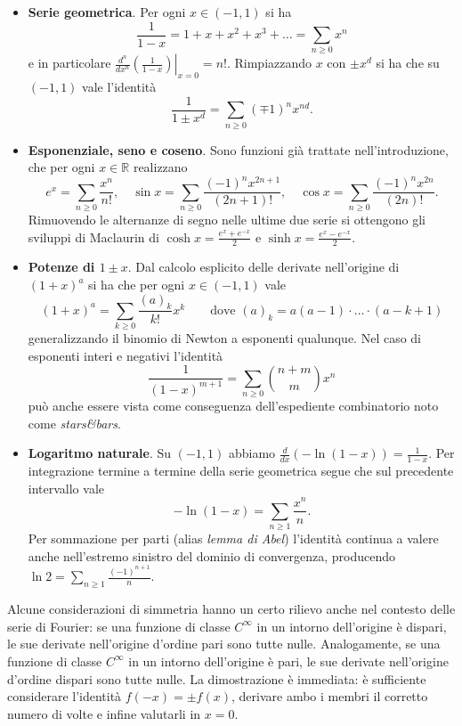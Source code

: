 \documentclass[a4paper,twoside]{article}
\newcommand{\R}{\mathbb{R}}
\theoremstyle{definition}
\numberwithin{theorem}{section}
\begin{document}
\begin{itemize}
 \item \textbf{Serie geometrica}. Per ogni $x\in(-1,1)$ si ha 
 $$ \frac{1}{1-x}=1+x+x^2+x^3+\ldots = \sum_{n\geq 0}x^n $$
 e in particolare $\left.\frac{d^n}{dx^n}\left(\frac{1}{1-x}\right)\right|_{x=0}=n!$. Rimpiazzando $x$ con $\pm x^d$ si ha che su $(-1,1)$ vale l'identità 
 $$ \frac{1}{1\pm x^d} = \sum_{n\geq 0}(\mp 1)^n x^{nd}. $$
 \item \textbf{Esponenziale, seno e coseno}. Sono funzioni già trattate nell'introduzione, che per ogni $x\in\R$ realizzano 
 $$ e^x = \sum_{n\geq 0}\frac{x^n}{n!},\quad \sin x=\sum_{n\geq 0}\frac{(-1)^n x^{2n+1}}{(2n+1)!}, \quad \cos x=\sum_{n\geq 0}\frac{(-1)^n x^{2n}}{(2n)!}. $$
 Rimuovendo le alternanze di segno nelle ultime due serie si ottengono gli sviluppi di Maclaurin di $\cosh x=\frac{e^x+e^{-x}}{2}$ e $\sinh x=\frac{e^x-e^{-x}}{2}$.
 \item \textbf{Potenze di $1\pm x$}. Dal calcolo esplicito delle derivate nell'origine di $(1+x)^{a}$ si ha che per ogni $x\in(-1,1)$ vale 
 $$ (1+x)^a = \sum_{k\geq 0}\frac{(a)_k}{k!} x^k\qquad\text{dove }(a)_k = a(a-1)\cdot\ldots\cdot (a-k+1) $$
 generalizzando il binomio di Newton a esponenti qualunque. Nel caso di esponenti interi e negativi l'identità 
 $$ \frac{1}{(1-x)^{m+1}} = \sum_{n\geq 0}\binom{n+m}{m} x^n $$
 può anche essere vista come conseguenza dell'espediente combinatorio noto come \emph{stars\&bars}.
 \item \textbf{Logaritmo naturale}. Su $(-1,1)$ abbiamo $\frac{d}{dx}\left(-\ln(1-x)\right)=\frac{1}{1-x}$. Per integrazione termine a termine della serie geometrica segue che sul precedente intervallo vale 
 $$ -\ln(1-x) = \sum_{n\geq 1}\frac{x^n}{n}. $$
 Per sommazione per parti (alias \emph{lemma di Abel}) l'identità continua a valere anche nell'estremo sinistro del dominio di convergenza, producendo $\ln 2 = \sum_{n\geq 1}\frac{(-1)^{n+1}}{n}$.
 
\end{itemize}

Alcune considerazioni di simmetria hanno un certo rilievo anche nel contesto delle serie di Fourier: se una funzione di classe $C^\infty$ in un intorno dell'origine è dispari, le sue derivate nell'origine d'ordine pari sono tutte nulle. Analogamente, se una funzione di classe $C^\infty$ in un intorno dell'origine è pari, le sue derivate nell'origine d'ordine dispari sono tutte nulle. La dimostrazione è immediata: è sufficiente considerare l'identità $f(-x)=\pm f(x)$, derivare ambo i membri il corretto numero di volte e infine valutarli in $x=0$.\\
\end{document}
